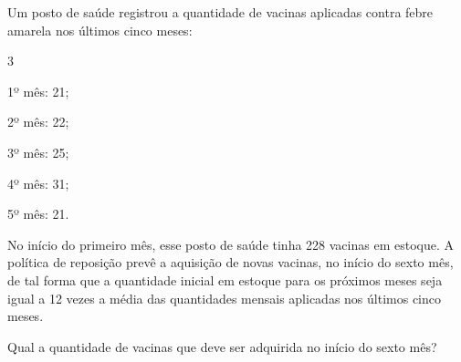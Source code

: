 %
%


\begin{exercicioBanco}[\valorquestao]
Um posto de saúde registrou a quantidade de vacinas aplicadas contra febre amarela nos últimos cinco meses:
\begin{itemize}
    \begin{multicols}{3}
        \item 1º mês: 21;
        \item 2º mês: 22;
        \item 3º mês: 25;
        \item 4º mês: 31;
        \item 5º mês: 21.
    \end{multicols}
\end{itemize}

No início do primeiro mês, esse posto de saúde tinha 228 vacinas em estoque. A política de reposição prevê a aquisição de novas vacinas, no início do sexto mês, de tal forma que a quantidade inicial em estoque para os próximos meses seja igual a 12 vezes a média das quantidades mensais aplicadas nos últimos cinco meses.

Qual a quantidade de vacinas que deve ser adquirida no início do sexto mês?
\end{exercicioBanco}

